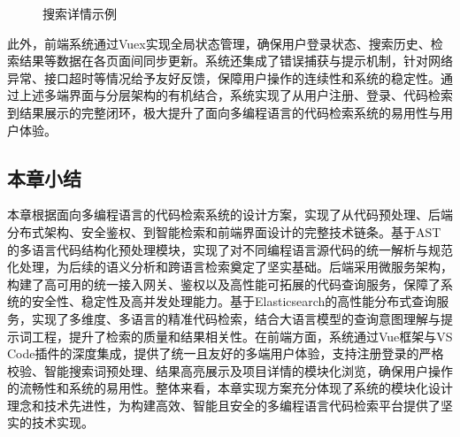 \documentclass[UTF8,a4paper,12pt]{ctexart}
\numberwithin{equation}{section}
\begin{document}
\begin{figure}[H]
	\caption{搜索详情示例}
	\label{repodetailpage}
\end{figure}
此外，前端系统通过Vuex实现全局状态管理，确保用户登录状态、搜索历史、检索结果等数据在各页面间同步更新。系统还集成了错误捕获与提示机制，针对网络异常、接口超时等情况给予友好反馈，保障用户操作的连续性和系统的稳定性。通过上述多端界面与分层架构的有机结合，系统实现了从用户注册、登录、代码检索到结果展示的完整闭环，极大提升了面向多编程语言的代码检索系统的易用性与用户体验。\par
\subsection{本章小结}
本章根据面向多编程语言的代码检索系统的设计方案，实现了从代码预处理、后端分布式架构、安全鉴权、到智能检索和前端界面设计的完整技术链条。基于AST的多语言代码结构化预处理模块，实现了对不同编程语言源代码的统一解析与规范化处理，为后续的语义分析和跨语言检索奠定了坚实基础。后端采用微服务架构，构建了高可用的统一接入网关、鉴权以及高性能可拓展的代码查询服务，保障了系统的安全性、稳定性及高并发处理能力。基于Elasticsearch的高性能分布式查询服务，实现了多维度、多语言的精准代码检索，结合大语言模型的查询意图理解与提示词工程，提升了检索的质量和结果相关性。在前端方面，系统通过Vue框架与VS Code插件的深度集成，提供了统一且友好的多端用户体验，支持注册登录的严格校验、智能搜索词预处理、结果高亮展示及项目详情的模块化浏览，确保用户操作的流畅性和系统的易用性。整体来看，本章实现方案充分体现了系统的模块化设计理念和技术先进性，为构建高效、智能且安全的多编程语言代码检索平台提供了坚实的技术实现。\par
\newpage
{}
\end{document}
